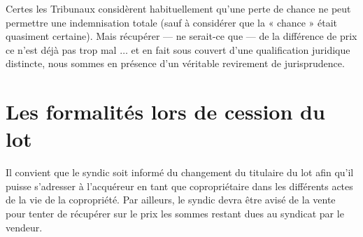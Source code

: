 			Certes les Tribunaux considèrent habituellement qu’une perte de chance ne peut permettre une
			indemnisation totale (sauf à considérer que la « chance » était quasiment certaine). Mais récupérer –-- ne
			serait-ce que  --- de la différence de prix ce n’est déjà pas trop mal $\dots$ et en fait sous couvert d’une qualification juridique distincte, nous sommes en présence d’un véritable revirement de jurisprudence.
	
\section{Les formalités lors de cession du lot}

	Il convient que le syndic soit informé du changement du titulaire du lot afin qu'il puisse s'adresser à
	l'acquéreur en tant que copropriétaire dans les différents actes de la vie de la copropriété. Par ailleurs, le
	syndic devra être avisé de la vente pour tenter de récupérer sur le prix les sommes restant dues au syndicat
	par le vendeur.
	
